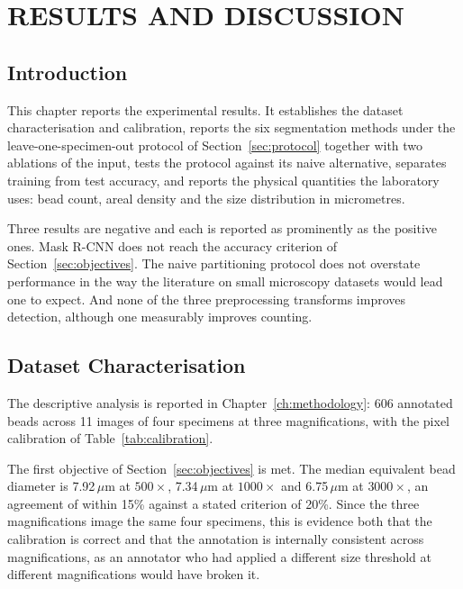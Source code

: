 \chapter{RESULTS AND DISCUSSION}
\label{ch:results}

%

\section{Introduction}

This chapter reports the experimental results. It establishes the dataset
characterisation and calibration, reports the six segmentation methods under the
leave-one-specimen-out protocol of Section~\ref{sec:protocol} together with two
ablations of the input, tests the protocol against its naive alternative,
separates training from test accuracy, and reports the physical quantities the
laboratory uses: bead count, areal density and the size distribution in
micrometres.

Three results are negative and each is reported as prominently as the positive
ones. Mask R-CNN does not reach the accuracy criterion of
Section~\ref{sec:objectives}. The naive partitioning protocol does not overstate
performance in the way the literature on small microscopy datasets would lead one
to expect. And none of the three preprocessing transforms improves detection,
although one measurably improves counting.

\section{Dataset Characterisation}

The descriptive analysis is reported in Chapter~\ref{ch:methodology}: 606
annotated beads across 11 images of four specimens at three magnifications,
with the pixel calibration of Table~\ref{tab:calibration}.

The first objective of Section~\ref{sec:objectives} is met. The median equivalent
bead diameter is 7.92\,$\mu$m at $500\times$, 7.34\,$\mu$m at $1000\times$ and
6.75\,$\mu$m at $3000\times$, an agreement of within 15\% against a stated
criterion of 20\%. Since the three magnifications image the same four specimens,
this is evidence both that the calibration is correct and that the annotation is
internally consistent across magnifications, as an annotator who had applied a
different size threshold at different magnifications would have broken it.

